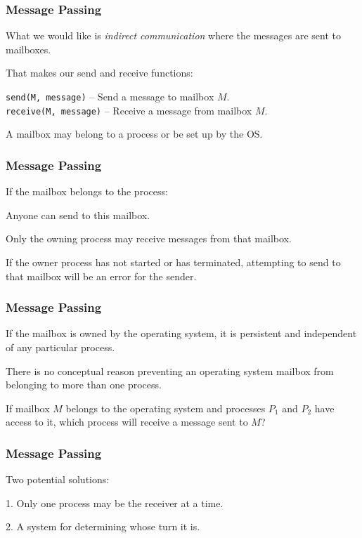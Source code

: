 \begin{frame}
	\frametitle{Message Passing}

	What we would like is \textit{indirect communication} where the messages are sent to mailboxes.

	That makes our send and receive functions:

	\texttt{send(M, message)} -- Send a message to mailbox $M$.\\
	\texttt{receive(M, message)} -- Receive a message from mailbox $M$.

	A mailbox may belong to a process or be set up by the OS.

\end{frame}

\begin{frame}
	\frametitle{Message Passing}
	If the mailbox belongs to the process:

	Anyone can send to this mailbox.

	Only the owning process may receive messages from that mailbox.

	If the owner process has not started or has terminated, attempting to send to that mailbox will be an error for the sender.

\end{frame}

\begin{frame}
	\frametitle{Message Passing}

	If the mailbox is owned by the operating system, it is persistent and independent of any particular process.

	There is no conceptual reason preventing an operating system mailbox from belonging to more than one process.

	If mailbox $M$ belongs to the operating system and processes $P_{1}$ and $P_{2}$ have access to it, which process will receive a message sent to $M$?

\end{frame}

\begin{frame}
	\frametitle{Message Passing}

	Two potential solutions:

	1. Only one process may be the receiver at a time.

	2. A system for determining whose turn it is.

\end{frame}

